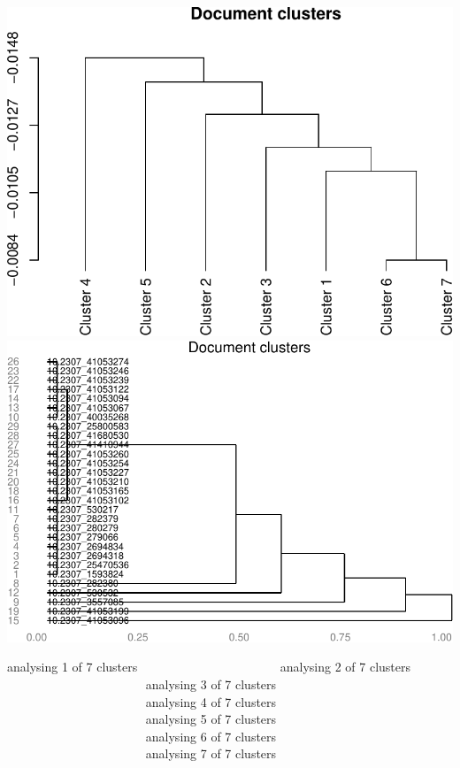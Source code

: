 \documentclass[10pt]{article}
\newenvironment{CodeChunk}{}{}
\begin{document}
\begin{CodeChunk}
\begin{CodeChunk}
\includegraphics{509Assignment_files/figure-latex/onegram3-22} 
\includegraphics{509Assignment_files/figure-latex/onegram3-23} \begin{CodeOutput}
analysing 1 of 7 clusters
analysing 2 of 7 clusters
analysing 3 of 7 clusters
analysing 4 of 7 clusters
analysing 5 of 7 clusters
analysing 6 of 7 clusters
analysing 7 of 7 clusters

\end{CodeOutput}


\end{CodeChunk}
\end{CodeChunk}
\end{document}
